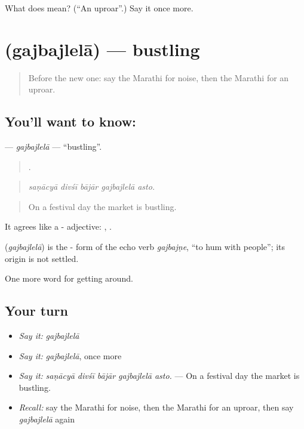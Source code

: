 \begin{tcolorbox}[breakable,colback=teal!4,colframe=teal!35!black,title={Before you move on}]
What does  mean? (\textquotedblleft{}An uproar\textquotedblright{}.) Say it once more.
\end{tcolorbox}
\section[\texorpdfstring{\mr{गजबजलेला} (gajbajlelā)}{गजबजलेला (gajbajlelā)}]{ (gajbajlelā) — bustling}

\label{lesson:MR-C422-gajbajlela}



\begin{quote}
Before the new one: say the Marathi for noise, then the Marathi for an uproar.
\end{quote}

\subsection*{You'll want to know: }
\textbf{} — \emph{gajbajlelā} — \textquotedblleft{}bustling\textquotedblright{}.

\begin{quote}
    .
\end{quote}

\begin{quote}
\emph{saṇācyā divśī bājār gajbajlelā asto.}
\end{quote}

\begin{quote}
On a festival day the market is bustling.
\end{quote}

It agrees like a - adjective:  ,  .

\begin{cousinweb}
\textbf{} (\emph{gajbajlelā}) is the - form of the echo verb \emph{gajbajṇe}, \textquotedblleft{}to hum with people\textquotedblright{}; its origin is not settled.
\end{cousinweb}

\begin{grammarlens}[title={What you've built}]
One more word for getting around.
\end{grammarlens}

\subsection*{Your turn}
\begin{itemize}
\raggedright
  \item \emph{Say it:} \emph{gajbajlelā}
  \item \emph{Say it:} \emph{gajbajlelā}, once more
  \item \emph{Say it:} \emph{saṇācyā divśī bājār gajbajlelā asto.} — On a festival day the market is bustling.
  \item \emph{Recall:} say the Marathi for noise, then the Marathi for an uproar, then say \emph{gajbajlelā} again
\end{itemize}

